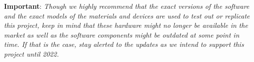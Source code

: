 \noindent
\textbf{Important}: \textit{Though we highly recommend that the exact versions of the software and the exact models of the materials and devices are used to test out or replicate this project, keep in mind that these hardware might no longer be available in the market as well as the software components might be outdated at some point in time. If that is the case, stay alerted to the updates as we intend to support this project until 2022.}


